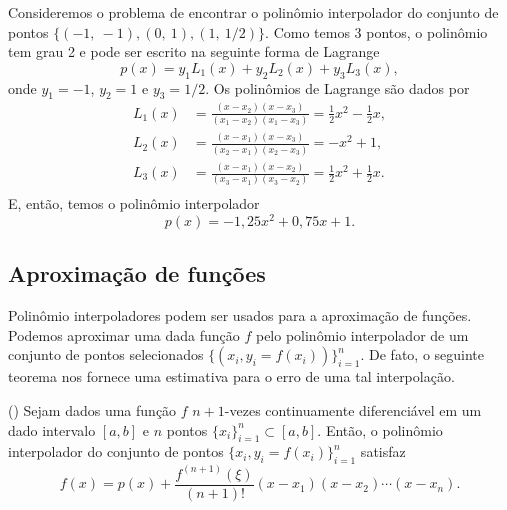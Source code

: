 \begin{ex}
  Consideremos o problema de encontrar o polinômio interpolador do conjunto de pontos $\{(-1,~-1), (0,~1), (1,~1/2)\}$. Como temos 3 pontos, o polinômio tem grau 2 e pode ser escrito na seguinte forma de Lagrange
  \begin{equation}
    p(x) = y_1L_1(x) + y_2L_2(x) + y_3L_3(x),
  \end{equation}
  onde $y_1 = -1$, $y_2 = 1$ e $y_3 = 1/2$. Os polinômios de Lagrange são dados por
  \begin{align}
    L_1(x) &= \frac{(x-x_2)(x-x_3)}{(x_1-x_2)(x_1-x_3)} = \frac{1}{2}x^2 - \frac{1}{2}x,\\
    L_2(x) &= \frac{(x-x_1)(x-x_3)}{(x_2-x_1)(x_2-x_3)} = -x^2 + 1,\\
    L_3(x) &= \frac{(x-x_1)(x-x_2)}{(x_3-x_1)(x_3-x_2)} = \frac{1}{2}x^2 + \frac{1}{2}x.\\
  \end{align}
  E, então, temos o polinômio interpolador
  \begin{equation}
    p(x) = -1,25x^2 + 0,75x + 1.
  \end{equation}

% 
\end{ex}

\subsection{Aproximação de funções}

Polinômio interpoladores podem ser usados para a aproximação de funções. Podemos aproximar uma dada função $f$ pelo polinômio interpolador de um conjunto de pontos selecionados $\{(x_i, y_i=f(x_i))\}_{i=1}^n$. De fato, o seguinte teorema nos fornece uma estimativa para o erro de uma tal interpolação.

\begin{teo}()\label{cap_interp_sec_lagrange:teo:lagrange}
  Sejam dados uma função $f$ $n+1$-vezes continuamente diferenciável em um dado intervalo $[a, b]$ e $n$ pontos $\{x_i\}_{i=1}^n\subset [a, b]$. Então, o polinômio interpolador do conjunto de pontos $\{x_i, y_i=f(x_i)\}_{i=1}^n$ satisfaz
  \begin{equation}
    f(x) = p(x) + \frac{f^{(n+1)}(\xi)}{(n+1)!}(x-x_1)(x-x_2)\cdots (x-x_n).
  \end{equation}
\end{teo}
\begin{dem}
  \emconstrucao
\end{dem}

